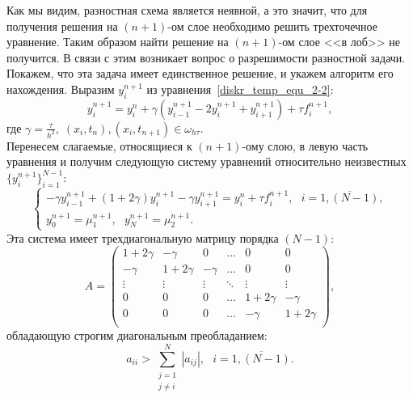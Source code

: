 \documentclass[11pt,a4paper,twoside,listtotoc,bibtotoc]{report}
\numberwithin{equation}{section}
\theoremstyle{definition}
\theoremstyle{plain}
\begin{document}
\begin{figure}[H]
\centering
{}
\end{figure}
%
Как мы видим, разностная схема является неявной, а это значит, что для получения
решения на
$(n+1)$-ом слое необходимо решить трехточечное уравнение. Таким образом найти решение
на $(n+1)$-ом слое <<в лоб>> не получится. В связи с этим возникает вопрос о
разрешимости разностной задачи.
Покажем, что эта задача имеет единственное решение, и укажем алгоритм его нахождения.
Выразим $y_i^{n+1}$ из уравнения~\eqref{diskr_temp_equ_2-2}:
%
$$
    y_i^{n+1} = y_i^n + \gamma\left(y_{i-1}^{n+1} - 2y_i^{n+1} + y_{i+1}^{n+1}\right) +
    \tau f_i^{n+1},
$$
%
где $\gamma = \frac{\tau}{h^2},\;(x_i, t_n), (x_i, t_{n+1})\in \omega_{h \tau}$.\\
Перенесем слагаемые, относящиеся к $(n+1)$-ому слою, в левую часть уравнения и получим следующую
систему уравнений относительно неизвестных $\{y_i^{n+1}\}_{i=1}^{N-1}$:
%
$$
    \begin{cases}
        -\gamma y_{i-1}^{n+1} + \left(1 + 2\gamma\right) y_i^{n+1} - \gamma y_{i+1}^{n+1} =
        y_i^n + \tau f_i^{n+1}, ~~~i = \overline{1,(N - 1)}, \\
        y_0^{n+1} = \mu_1^{n+1}, ~~~y_N^{n+1} = \mu_2^{n+1}.
    \end{cases}
$$
%
Эта система имеет трехдиагональную матрицу порядка $(N-1)$:
%
$$
    A =
    \begin{pmatrix}
      1 + 2\gamma & -\gamma & 0 & \dots & 0 & 0 \\
      -\gamma & 1 + 2\gamma & -\gamma & \dots & 0 & 0\\
      \vdots & \vdots & \vdots & \ddots & \vdots & \vdots\\
      0 & 0  & 0 & \dots & 1 + 2\gamma & -\gamma \\
      0 & 0  & 0 & \dots & -\gamma & 1 + 2\gamma  \\
    \end{pmatrix},
$$
%
обладающую строгим диагональным преобладанием:
%
$$
    a_{ii} > \sum \limits_{\substack{j=1\\j\ne i}}^N\left|a_{ij}\right|, ~~~i=\overline{1, (N-1)}.
$$
%
\end{document}
